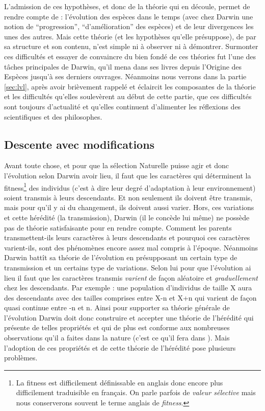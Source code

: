 \documentclass[a4paper,10pt]{article}
\begin{document}
L'admission de ces hypothèses, et donc de la théorie qui en découle, permet de rendre compte de : l'évolution des espèces dans le temps (avec chez Darwin une notion de ``progression'', ``d'amélioration'' des espèces) et de leur divergences les unes des autres. Mais cette théorie (et les hypothèses qu'elle présuppose), de par sa structure et son contenu, n'est simple ni à observer ni à démontrer. Surmonter ces difficultés et essayer de convaincre du bien fondé de ces théories fut l'une des tâches principales de Darwin, qu'il mena dans ses livres depuis l'Origine des Espèces jusqu'à ses derniers ouvrages. Néanmoins nous verrons dans la partie \ref{sec:lvl}, après avoir brièvement rappelé et éclaircit les composantes de la théorie et les difficultés qu'elles soulevèrent au début de cette partie, que ces difficultés sont toujours d'actualité et qu'elles continuent d'alimenter les réflexions des scientifiques et des philosophes. 

\subsection{Descente avec modifications}\label{sec:hered}
Avant toute chose, et pour que la sélection Naturelle puisse agir et donc l'évolution selon Darwin avoir lieu, il faut que les caractères qui déterminent la fitness\footnote{La fitness est difficilement définissable en anglais donc encore plus difficilement traduisible en français. On parle parfois de \emph{valeur sélective} mais nous conserverons souvent le terme anglais de \emph{fitness}.} des individus (c'est à dire leur degré d'adaptation à leur environnement) soient transmis à leurs descendants. Et non seulement ils doivent être transmis, mais pour qu'il y ai du changement, ils doivent aussi varier. Hors, ces variations et cette hérédité (la transmission), Darwin (il le concède lui même) ne possède pas de théorie satisfaisante pour en rendre compte. Comment les parents transmettent-ils leurs caractères à leurs descendants et pourquoi ces caractères varient-ils, sont des phénomènes encore assez mal compris à l'époque. Néanmoins Darwin battît sa théorie de l'évolution en présupposant un certain type de transmission et un certains type de variations. Selon lui pour que l'évolution ai lieu il faut que les caractères transmis \emph{varient} de façon aléatoire et \emph{graduellement} chez les descendants. Par exemple : une population d'individus de taille X aura des descendants avec des tailles comprises entre X-n et X+n qui varient de façon quasi continue entre -n et n. Ainsi pour supporter sa théorie générale de l'évolution Darwin doit donc construire et accepter une théorie de l'hérédité qui présente de telles propriétés et qui de plus est conforme aux nombreuses observations qu'il a faites dans la nature (c'est ce qu'il fera dans \cite{darwin1868variation}). Mais l'adoption de ces propriétés et de cette théorie de l'hérédité pose plusieurs problèmes.
\end{document}
